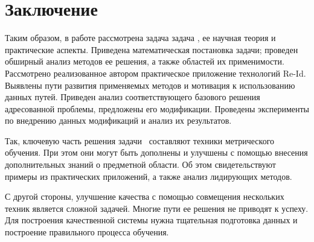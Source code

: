 \chapter{Заключение}
\label{ch:conclusion}

Таким образом, в работе рассмотрена задача задача \reid, ее научная теория и практические аспекты. Приведена математическая постановка задачи; проведен обширный анализ методов ее решения, а также областей их применимости. Рассмотрено реализованное автором практическое приложение технологий Re-Id. Выявлены пути развития применяемых методов и мотивация к использованию данных путей. Приведен анализ соответствующего базового решения адресованной проблемы, предложены его модификации. Проведены эксперименты по внедрению данных модификаций и анализ их результатов.

Так, ключевую часть решения задачи \reid\ составляют техники метрического обучения. При этом они могут быть дополнены и улучшены с помощью внесения дополнительных знаний о предметной области. Об этом свидетельствуют примеры из практических приложений, а также анализ лидирующих методов.

С другой стороны, улучшение качества с помощью совмещения нескольких техник является сложной задачей. Многие пути ее решения не приводят к успеху. Для построения качественной системы нужна тщательная подготовка данных и построение правильного процесса обучения.
